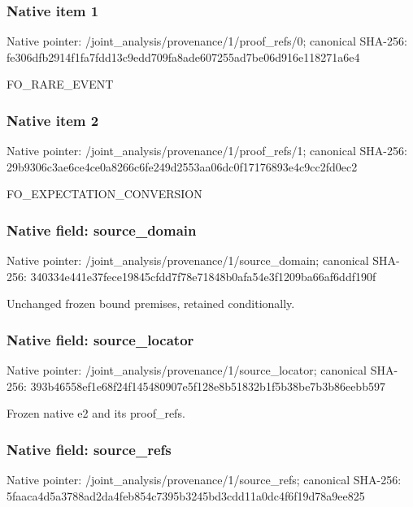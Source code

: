 \documentclass[10pt,a4paper]{article}
\begin{document}
\subsubsection{Native item 1}


Native pointer: /joint\_analysis/provenan\allowbreak{}ce/1/proof\_refs/0; canonical SHA-256: fe306dfb2914f1fa7fdd13c9\allowbreak{}edd709fa8ade607255ad7be0\allowbreak{}6d916e118271a6e4


FO\_RARE\_EVENT


\subsubsection{Native item 2}


Native pointer: /joint\_analysis/provenan\allowbreak{}ce/1/proof\_refs/1; canonical SHA-256: 29b9306c3ae6ce4ce0a8266c\allowbreak{}6fe249d2553aa06dc0f17176\allowbreak{}893e4c9cc2fd0ec2


FO\_EXPECTATION\_CONVERSION


\subsubsection{Native field: source\_domain}


Native pointer: /joint\_analysis/provenan\allowbreak{}ce/1/source\_domain; canonical SHA-256: 340334e441e37fece19845cf\allowbreak{}dd7f78e71848b0afa54e3f12\allowbreak{}09ba66af6ddf190f


Unchanged frozen bound premises, retained conditionally.


\subsubsection{Native field: source\_locator}


Native pointer: /joint\_analysis/provenan\allowbreak{}ce/1/source\_locator; canonical SHA-256: 393b46558ef1e68f24f14548\allowbreak{}0907e5f128e8b51832b1f5b3\allowbreak{}8be7b3b86eebb597


Frozen native e2 and its proof\_refs.


\subsubsection{Native field: source\_refs}


Native pointer: /joint\_analysis/provenan\allowbreak{}ce/1/source\_refs; canonical SHA-256: 5faaca4d5a3788ad2da4feb8\allowbreak{}54c7395b3245bd3cdd11a0dc\allowbreak{}4f6f19d78a9ee825
\end{document}
